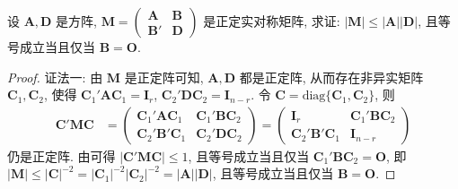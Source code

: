 \documentclass[../../main.tex]{subfiles}
\begin{document}
\begin{proposition}\label{proposition:正定分块阵的行列式相关不等式}
设 \(\boldsymbol{A},\boldsymbol{D}\) 是方阵, \(\boldsymbol{M}=\begin{pmatrix}\boldsymbol{A}&\boldsymbol{B}\\\boldsymbol{B}'&\boldsymbol{D}\end{pmatrix}\) 是正定实对称矩阵, 求证: \(|\boldsymbol{M}|\leqslant |\boldsymbol{A}||\boldsymbol{D}|\), 且等号成立当且仅当 \(\boldsymbol{B}=\boldsymbol{O}\).
\end{proposition}
\begin{proof}
{\color{blue}证法一:}
由 \(\boldsymbol{M}\) 是正定阵可知, \(\boldsymbol{A},\boldsymbol{D}\) 都是正定阵, 从而存在非异实矩阵 \(\boldsymbol{C}_1,\boldsymbol{C}_2\), 使得 \(\boldsymbol{C}_1'\boldsymbol{A}\boldsymbol{C}_1=\boldsymbol{I}_r\), \(\boldsymbol{C}_2'\boldsymbol{D}\boldsymbol{C}_2=\boldsymbol{I}_{n - r}\). 令 \(\boldsymbol{C}=\text{diag}\{\boldsymbol{C}_1,\boldsymbol{C}_2\}\), 则
\begin{align*}
\boldsymbol{C}'\boldsymbol{M}\boldsymbol{C}&=\begin{pmatrix}\boldsymbol{C}_1'\boldsymbol{A}\boldsymbol{C}_1&\boldsymbol{C}_1'\boldsymbol{B}\boldsymbol{C}_2\\\boldsymbol{C}_2'\boldsymbol{B}'\boldsymbol{C}_1&\boldsymbol{C}_2'\boldsymbol{D}\boldsymbol{C}_2\end{pmatrix}=\begin{pmatrix}\boldsymbol{I}_r&\boldsymbol{C}_1'\boldsymbol{B}\boldsymbol{C}_2\\\boldsymbol{C}_2'\boldsymbol{B}'\boldsymbol{C}_1&\boldsymbol{I}_{n - r}\end{pmatrix}
\end{align*}
仍是正定阵. 由可得 \(|\boldsymbol{C}'\boldsymbol{M}\boldsymbol{C}|\leqslant 1\), 且等号成立当且仅当 \(\boldsymbol{C}_1'\boldsymbol{B}\boldsymbol{C}_2=\boldsymbol{O}\), 即 \(|\boldsymbol{M}|\leqslant |\boldsymbol{C}|^{-2}=|\boldsymbol{C}_1|^{-2}|\boldsymbol{C}_2|^{-2}=|\boldsymbol{A}||\boldsymbol{D}|\), 且等号成立当且仅当 \(\boldsymbol{B}=\boldsymbol{O}\). 


\end{proof}
\end{document}
